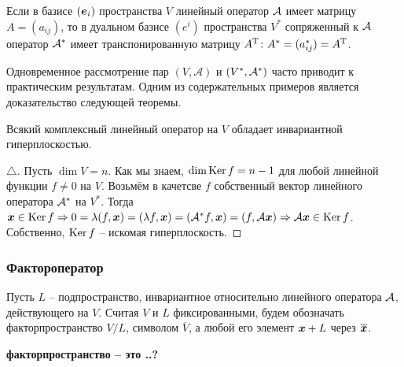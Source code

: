 \begin{to_thr} 
    Если в базисе $(\mbox{\boldmath $e$}_i)$ пространства $V$ линейный оператор $\mathcal A$ имеет матрицу $A = (a_{ij})$, то в дуальном базисе $(e^i)$ пространства $V^*$ сопряженный к $\mathcal A$ оператор $\mathcal A^*$ имеет транспонированную матрицу $A^{\text{T}} \colon A^* = (a_{ij}^*) = A^{\text{T}}$.
\end{to_thr}

Одновременное рассмотрение пар $(V, \mathcal A)$ и $(V^*, \mathcal A^*)$ часто приводит к практическим результатам. Одним из содержательных примеров является доказательство следующей теоремы.

\begin{to_thr} 
    Всякий комплексный линейный оператор на $V$ обладает инвариантной гиперплоскостью. 
\end{to_thr}

\begin{proof}[$\triangle$]
    Пусть $\dim V =n$. Как мы знаем, $\dim \mathop{\mathrm{Ker}}\nolimits f = n - 1$ для любой линейной функции $f \neq 0$ на $V$. Возьмём в качетсве $f$ собственный вектор линейного оператора $\mathcal A^*$ на $V^*$. Тогда $\mbox{\boldmath $x$} \in \mathop{\mathrm{Ker}}\nolimits f \Rightarrow 0 = \lambda(f, \mbox{\boldmath $x$}) = (\lambda f, \mbox{\boldmath $x$}) = (\mathcal A^* f, \mbox{\boldmath $x$}) = (f, \mathcal A \mbox{\boldmath $x$}) \Rightarrow \mathcal A \mbox{\boldmath $x$} \in \mathop{\mathrm{Ker}}\nolimits f$. Собственно, $\mathop{\mathrm{Ker}}\nolimits f$ -- искомая гиперплоскость.
\end{proof}


\subsubsection{Фактороператор}

Пусть $L$ -- подпространство, инвариантное относительно линейного оператора $\mathcal A$, действующего на $V$. Считая $V$ и $L$ фиксированными, будем обозначать факторпространство $V/L$, символом $\overline{V}$, а любой его элемент $\mbox{\boldmath $x$} + L$ через $\overline{\mbox{\boldmath $x$}}$.

\textbf{факторпространство -- это ..?}